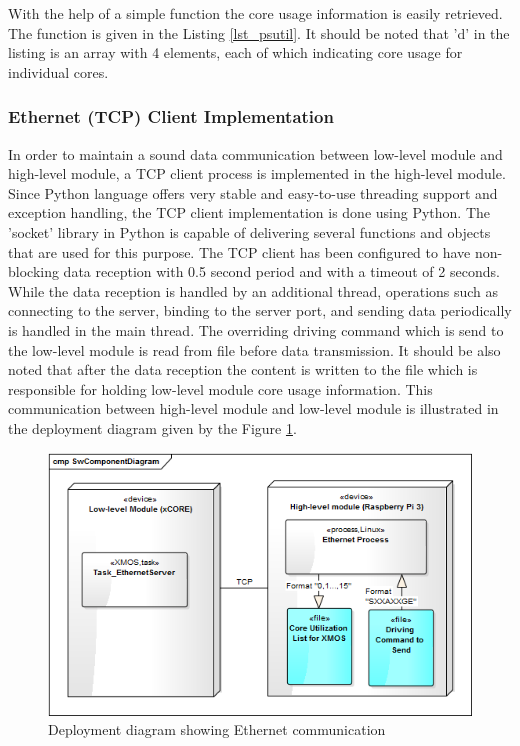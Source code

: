 With the help of a simple function the core usage information is easily retrieved. The function is given in the Listing \ref{lst_psutil}. It should be noted that 'd' in the listing is an array with 4 elements, each of which indicating core usage for individual cores.



\subsubsection{Ethernet (TCP) Client Implementation}
In order to maintain a sound data communication between low-level module and high-level module, a TCP client process is implemented in the high-level module. Since Python language offers very stable and easy-to-use threading support and exception handling, the TCP client implementation is done using Python. The 'socket' library \cite{socketpython} in Python is capable of delivering several functions and objects that are used for this purpose. The TCP client has been configured to have non-blocking data reception with 0.5 second period and with a timeout of 2 seconds. While the data reception is handled by an additional thread, operations such as connecting to the server, binding to the server port, and sending data periodically is handled in the main thread. The overriding driving command which is send to the low-level module is read from file before data transmission. It should be also noted that after the data reception the content is written to the file which is responsible for holding low-level module core usage information. This communication between high-level module and low-level module is illustrated in the deployment diagram given by the Figure \ref{fig:ethernetdeployment}.

\begin{figure}[!ht]
	\centering
	\includegraphics[scale=0.7]{content/images/ethernetdeployment.png}
	\caption{Deployment diagram showing Ethernet communication}
	\label{fig:ethernetdeployment}
\end{figure}



